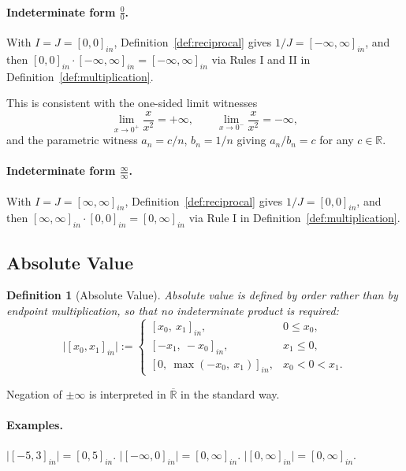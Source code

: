 \documentclass[11pt,a4paper]{article}
\theoremstyle{paperdef}
\newtheorem{definition}[theorem]{Definition}
\newcommand{\Rext}{\overline{\mathbb{R}}}
\newcommand{\inI}[1]{[#1]_{in}}
\begin{document}
\paragraph{Indeterminate form $\tfrac{0}{0}$.} With
$I = J = \inI{0, 0}$, Definition~\ref{def:reciprocal} gives
$1/J = \inI{-\infty, \infty}$, and then
$\inI{0, 0} \cdot \inI{-\infty, \infty} = \inI{-\infty, \infty}$ via
Rules I and II in Definition~\ref{def:multiplication}.

This is consistent with the one-sided limit witnesses
\[
\lim_{x \to 0^{+}} \frac{x}{x^{2}} = +\infty, \qquad
\lim_{x \to 0^{-}} \frac{x}{x^{2}} = -\infty,
\]
and the parametric witness $a_n = c/n$, $b_n = 1/n$ giving
$a_n / b_n = c$ for any $c \in \mathbb{R}$.

\paragraph{Indeterminate form $\tfrac{\infty}{\infty}$.} With
$I = J = \inI{\infty, \infty}$, Definition~\ref{def:reciprocal} gives
$1/J = \inI{0, 0}$, and then
$\inI{\infty, \infty} \cdot \inI{0, 0} = \inI{0, \infty}$ via Rule I
in Definition~\ref{def:multiplication}.

\subsection{Absolute Value}\label{sec:absolute-value}

\begin{definition}[Absolute Value]\label{def:abs}
Absolute value is defined by order rather than by endpoint
multiplication, so that no indeterminate product is required:
\[
\lvert \inI{x_0, x_1} \rvert :=
\begin{cases}
\inI{x_0,\ x_1}, & 0 \le x_0, \\
\inI{-x_1,\ -x_0}, & x_1 \le 0, \\
\inI{0,\ \max(-x_0,\ x_1)}, & x_0 < 0 < x_1.
\end{cases}
\]
\end{definition}

Negation of $\pm\infty$ is interpreted in $\Rext$ in the standard way.

\paragraph{Examples.}
$\lvert \inI{-5, 3} \rvert = \inI{0, 5}$.
$\lvert \inI{-\infty, 0} \rvert = \inI{0, \infty}$.
$\lvert \inI{0, \infty} \rvert = \inI{0, \infty}$.
\end{document}
